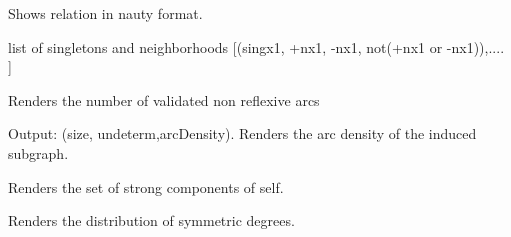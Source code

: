 \documentclass[letterpaper,10pt,english]{sphinxmanual}
\begin{document}
\begin{fulllineitems}
\begin{fulllineitems}
\end{fulllineitems}


\begin{fulllineitems}
\label{techDoc:digraphs.Digraph.showdre}
Shows relation in nauty format.

\end{fulllineitems}


\begin{fulllineitems}
\label{techDoc:digraphs.Digraph.singletons}
list of singletons and neighborhoods
{[}(singx1, +nx1, -nx1, not(+nx1 or -nx1)),.... {]}

\end{fulllineitems}


\begin{fulllineitems}
\label{techDoc:digraphs.Digraph.size}
Renders the number of validated non reflexive arcs

\end{fulllineitems}


\begin{fulllineitems}
\label{techDoc:digraphs.Digraph.sizeSubGraph}
Output: (size, undeterm,arcDensity).
Renders the arc density of the induced subgraph.

\end{fulllineitems}


\begin{fulllineitems}
\label{techDoc:digraphs.Digraph.strongComponents}
Renders the set of strong components of self.

\end{fulllineitems}


\begin{fulllineitems}
\label{techDoc:digraphs.Digraph.symDegreesDistribution}
Renders the distribution of symmetric degrees.


\end{fulllineitems}
\end{fulllineitems}
\end{document}
